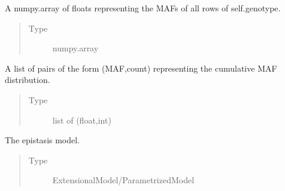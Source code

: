 \documentclass[a4paper,10pt,english]{sphinxhowto}
\begin{document}
\begin{fulllineitems}
\begin{fulllineitems}
\end{fulllineitems}


\begin{fulllineitems}
\label{\detokenize{utils:utils.data_simulator.DataSimulator.mafs}}
A numpy.array of floats representing the MAFs of all rows of self.genotype.
\begin{quote}\begin{description}
\item[{Type}] \leavevmode
numpy.array

\end{description}\end{quote}

\end{fulllineitems}


\begin{fulllineitems}
\label{\detokenize{utils:utils.data_simulator.DataSimulator.cum_mafs}}
A list of pairs of the form (MAF,count) representing the cumulative MAF distribution.
\begin{quote}\begin{description}
\item[{Type}] \leavevmode
list of (float,int)

\end{description}\end{quote}

\end{fulllineitems}


\begin{fulllineitems}
\label{\detokenize{utils:utils.data_simulator.DataSimulator.model}}
The epistasis model.
\begin{quote}\begin{description}
\item[{Type}] \leavevmode
ExtensionalModel/ParametrizedModel


\end{description}
\end{quote}
\end{fulllineitems}
\end{fulllineitems}
\end{document}
